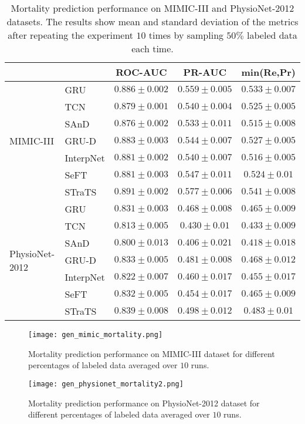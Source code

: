 \begin{table}[]
\centering
    \caption{Mortality prediction performance on MIMIC-III and PhysioNet-2012 datasets. The results show mean and standard deviation of the metrics after repeating the experiment $10$ times by sampling $50\%$ labeled data each time.}
    \label{tab:pred_perf}
    \begin{tabular}{llccc}
    \toprule
    & &ROC-AUC &PR-AUC &min(Re,Pr) \\
    \midrule
    \multirow{7}{*}{MIMIC-III}
    &GRU &$0.886\pm0.002$ &$0.559\pm0.005$ &$0.533\pm0.007$\\
&TCN &$0.879\pm0.001$ &$0.540\pm0.004$ &$0.525\pm0.005$\\
    &SAnD &$0.876\pm0.002$ &$0.533\pm0.011$ &$0.515\pm0.008$\\
    &GRU-D &$0.883\pm0.003$ &$0.544\pm0.007$ &$0.527\pm0.005$\\
    &InterpNet &$0.881\pm0.002$ &$0.540\pm0.007$ &$0.516\pm0.005$\\
    &SeFT &$0.881\pm0.003$ &$0.547\pm0.011$ &$0.524\pm0.01$\\
    &STraTS &$\mathbf{0.891\pm0.002}$ &$\mathbf{0.577\pm0.006}$ &$\mathbf{0.541\pm0.008}$\\
    \hline
    \multirow{7}{*}{PhysioNet-2012}
    &GRU &$0.831\pm0.003$ &$0.468\pm0.008$ &$0.465\pm0.009$\\
    
    &TCN &$0.813\pm0.005$ &$0.430\pm0.01$ &$0.433\pm0.009$\\
    &SAnD &$0.800\pm0.013$ &$0.406\pm0.021$ &$0.418\pm0.018$\\
    &GRU-D &$0.833\pm0.005$ &$0.481\pm0.008$ &$0.468\pm0.012$\\
    &InterpNet &$0.822\pm0.007$ &$0.460\pm0.017$ &$0.455\pm0.017$\\
    &SeFT &$0.832\pm0.005$ &$0.454\pm0.017$ &$0.465\pm0.009$\\
    &STraTS &$\mathbf{0.839\pm0.008}$ &$\mathbf{0.498\pm0.012}$ &$\mathbf{0.483\pm0.01}$\\
    \bottomrule
    \end{tabular}
\end{table}


\begin{figure}
    \centering
    \texttt{[image: gen\_mimic\_mortality.png]}
    \caption{Mortality prediction performance on MIMIC-III dataset for different percentages of labeled data averaged over $10$ runs.}
    \label{fig:gen_mimic_mort}
\end{figure}
\begin{figure}
    \centering
    \texttt{[image: gen\_physionet\_mortality2.png]}
    \caption{Mortality prediction performance on PhysioNet-2012 dataset for different percentages of labeled data averaged over $10$ runs.}
    \label{fig:gen_phy_mort}
\end{figure}

